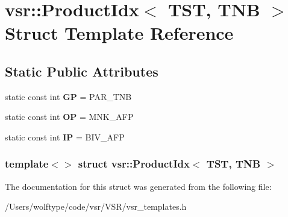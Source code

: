 \hypertarget{structvsr_1_1_product_idx_3_01_t_s_t_00_01_t_n_b_01_4}{\section{vsr\-:\-:Product\-Idx$<$ T\-S\-T, T\-N\-B $>$ Struct Template Reference}
\label{structvsr_1_1_product_idx_3_01_t_s_t_00_01_t_n_b_01_4}
}
\subsection*{Static Public Attributes}
\begin{DoxyCompactItemize}
\item 
\hypertarget{structvsr_1_1_product_idx_3_01_t_s_t_00_01_t_n_b_01_4_a6202f00e7436d95562e5d1cb54ce71c8}{static const int {\bfseries G\-P} = P\-A\-R\-\_\-\-T\-N\-B}\label{structvsr_1_1_product_idx_3_01_t_s_t_00_01_t_n_b_01_4_a6202f00e7436d95562e5d1cb54ce71c8}

\item 
\hypertarget{structvsr_1_1_product_idx_3_01_t_s_t_00_01_t_n_b_01_4_a7af8db5ef19ba62506c55da0ae0e112e}{static const int {\bfseries O\-P} = M\-N\-K\-\_\-\-A\-F\-P}\label{structvsr_1_1_product_idx_3_01_t_s_t_00_01_t_n_b_01_4_a7af8db5ef19ba62506c55da0ae0e112e}

\item 
\hypertarget{structvsr_1_1_product_idx_3_01_t_s_t_00_01_t_n_b_01_4_a2968d0847dc1cbea4e98872e02b0b619}{static const int {\bfseries I\-P} = B\-I\-V\-\_\-\-A\-F\-P}\label{structvsr_1_1_product_idx_3_01_t_s_t_00_01_t_n_b_01_4_a2968d0847dc1cbea4e98872e02b0b619}

\end{DoxyCompactItemize}
\subsubsection*{template$<$$>$ struct vsr\-::\-Product\-Idx$<$ T\-S\-T, T\-N\-B $>$}



The documentation for this struct was generated from the following file\-:\begin{DoxyCompactItemize}
\item 
/\-Users/wolftype/code/vsr/\-V\-S\-R/vsr\-\_\-templates.\-h\end{DoxyCompactItemize}
